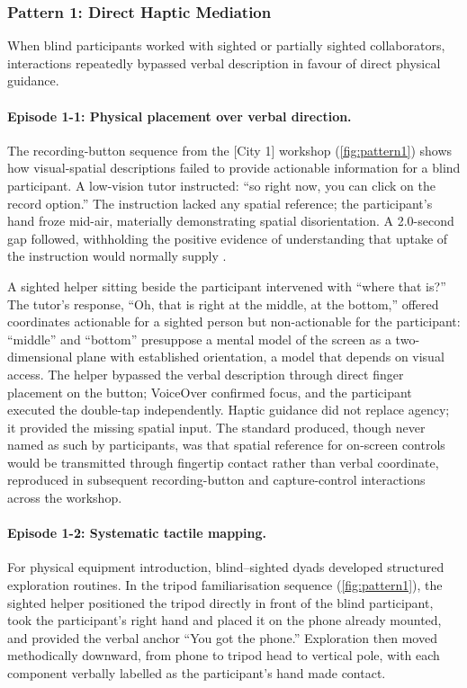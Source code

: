\subsubsection{Pattern 1: Direct Haptic Mediation}

When blind participants worked with sighted or partially sighted collaborators, interactions repeatedly bypassed verbal description in favour of direct physical guidance.

\paragraph{Episode 1-1: Physical placement over verbal direction.}
The recording-button sequence from the [City 1] workshop (\autoref{fig:pattern1}) shows how visual-spatial descriptions failed to provide actionable information for a blind participant. A low-vision tutor instructed: ``so right now, you can click on the record option.'' The instruction lacked any spatial reference; the participant's hand froze mid-air, materially demonstrating spatial disorientation. A 2.0-second gap followed, withholding the positive evidence of understanding that uptake of the instruction would normally supply \cite{clark_grounding_1991}.

A sighted helper sitting beside the participant intervened with ``where that is?'' The tutor's response, ``Oh, that is right at the middle, at the bottom,'' offered coordinates actionable for a sighted person but non-actionable for the participant: ``middle'' and ``bottom'' presuppose a mental model of the screen as a two-dimensional plane with established orientation, a model that depends on visual access. The helper bypassed the verbal description through direct finger placement on the button; VoiceOver confirmed focus, and the participant executed the double-tap independently. Haptic guidance did not replace agency; it provided the missing spatial input. The standard produced, though never named as such by participants, was that spatial reference for on-screen controls would be transmitted through fingertip contact rather than verbal coordinate, reproduced in subsequent recording-button and capture-control interactions across the workshop.

\paragraph{Episode 1-2: Systematic tactile mapping.}
For physical equipment introduction, blind--sighted dyads developed structured exploration routines. In the tripod familiarisation sequence (\autoref{fig:pattern1}), the sighted helper positioned the tripod directly in front of the blind participant, took the participant's right hand and placed it on the phone already mounted, and provided the verbal anchor ``You got the phone.'' Exploration then moved methodically downward, from phone to tripod head to vertical pole, with each component verbally labelled as the participant's hand made contact.

